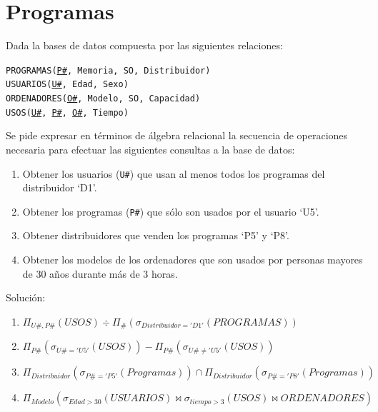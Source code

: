 \documentclass[a4paper]{article}
\begin{document}
\section{Programas}

Dada la bases de datos compuesta por las siguientes relaciones:

\begin{addmargin}[1.5em]{0em}
    \texttt{PROGRAMAS(\underline{P\#}, Memoria, SO, Distribuidor)}\\
    \texttt{USUARIOS(\underline{U\#}, Edad, Sexo)}\\
    \texttt{ORDENADORES(\underline{O\#}, Modelo, SO, Capacidad)}\\
    \texttt{USOS(\underline{U\#}, \underline{P\#}, \underline{O\#}, Tiempo)}
\end{addmargin}

Se pide expresar en términos de álgebra relacional la secuencia de operaciones necesaria para efectuar las siguientes consultas a la base de datos:

\begin{enumerate}
    \item Obtener los usuarios (\texttt{U\#}) que usan al menos todos los programas del distribuidor `D1'.
    \item Obtener los programas (\texttt{P\#}) que sólo son usados por el usuario `U5'.
    \item Obtener distribuidores que venden los programas `P5' y `P8'.
    \item Obtener los modelos de los ordenadores que son usados por personas mayores de 30 años durante más de 3 horas.
\end{enumerate}

\begin{solution}
    Solución:

    \begin{enumerate}
        \item $\Pi_{U\#, P\#} \left( USOS \right) \div \Pi_{\#} \left( \sigma_{Distribuidor='D1'} \left( PROGRAMAS \right) \right)$
        \item $\Pi_{P\#} \left( \sigma_{U\#='U5'} \left( USOS \right)\right) - \Pi_{P\#} \left( \sigma_{U\#\neq'U5'} \left( USOS \right)\right)$
        \item $\Pi_{Distribuidor} \left( \sigma_{P\#='P5'} \left( Programas \right) \right) \cap \Pi_{Distribuidor} \left( \sigma_{P\#='P8'} \left( Programas \right) \right)$
        \item $\Pi_{Modelo} \left( \sigma_{Edad > 30} \left( USUARIOS \right) \bowtie \sigma_{tiempo > 3} \left( USOS \right) \bowtie ORDENADORES \right)$
    \end{enumerate}
\end{solution}
\end{document}
